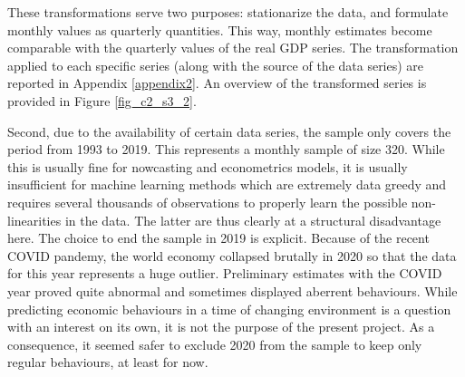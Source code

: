 \newpage

\begin{table}[H] \centering
{}
\captionsetup{justification=centering}
\caption{\textbf{Raw data transformations}}
\label{table_c2_s3_1}
\end{table}

These transformations serve two purposes: stationarize the data, and formulate monthly values as quarterly quantities. This way, monthly estimates become comparable with the quarterly values of the real GDP series. The transformation applied to each specific series (along with the source of the data series) are reported in Appendix \ref{appendix2}. An overview of the transformed series is provided in Figure \ref{fig_c2_s3_2}. 

Second, due to the availability of certain data series, the sample only covers the period from 1993 to 2019. This represents a monthly sample of size 320. While this is usually fine for nowcasting and econometrics models, it is usually insufficient for machine learning methods which are extremely data greedy and requires several thousands of observations to properly learn the possible non-linearities in the data. The latter are thus clearly at a structural disadvantage here. The choice to end the sample in 2019 is explicit. Because of the recent COVID pandemy, the world economy collapsed brutally in 2020 so that the data for this year represents a huge outlier. Preliminary estimates with the COVID year proved quite abnormal and sometimes displayed aberrent behaviours. While predicting economic behaviours in a time of changing environment is a question with an interest on its own, it is not the purpose of the present project. As a consequence, it seemed safer to exclude 2020 from the sample to keep only regular behaviours, at least for now.


